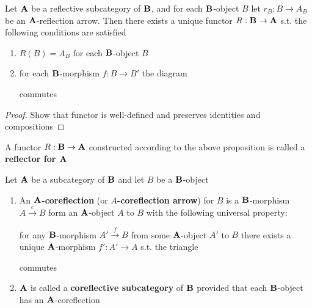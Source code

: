 \documentclass[11pt]{article}
\begin{document}
\begin{proposition}[]
Let \(\operatorname{\textbf{A}}\) be a reflective subcategory of \(\operatorname{\textbf{B}}\), and for each
\(\operatorname{\textbf{B}}\)-object \(B\) let \(r_B:B\to A_B\) be an \(\operatorname{\textbf{A}}\)-reflection arrow.
Then there exists a unique functor \(R:\operatorname{\textbf{B}}\to\operatorname{\textbf{A}}\) s.t. the following
conditions are satisfied
\begin{enumerate}
\item \(R(B)=A_B\) for each \(\operatorname{\textbf{B}}\)-object \(B\)
\item for each \(\operatorname{\textbf{B}}\)-morphism \(f:B\to B'\) the diagram
\begin{center}\end{center}
commutes
\end{enumerate}
\end{proposition}

\begin{proof}
Show that functor is well-defined and preserves identities and compositions
\end{proof}

\begin{definition}[]
A functor \(R:\operatorname{\textbf{B}}\to\operatorname{\textbf{A}}\) constructed according to the above proposition is
called a \textbf{reflector for \(\operatorname{\textbf{A}}\)}
\end{definition}

\begin{definition}[]
Let \(\operatorname{\textbf{A}}\) be a subcategory of \(\operatorname{\textbf{B}}\) and let \(B\) be a \(\operatorname{\textbf{B}}\)-object
\begin{enumerate}
\item An \textbf{\(\operatorname{\textbf{A}}\)-coreflection} (or \textbf{\(A\)-coreflection arrow}) for \(B\) is a
\(\operatorname{\textbf{B}}\)-morphism \(A\xrightarrow{c}B\) form an \(\operatorname{\textbf{A}}\)-object \(A\) to
\(B\) with the following universal property:

for any \(\operatorname{\textbf{B}}\)-morphism \(A'\xrightarrow{f}B\) from some \(\operatorname{\textbf{A}}\)-object
\(A'\) to \(B\) there exists a unique \(\operatorname{\textbf{A}}\)-morphism \(f':A'\to A\) s.t.
the triangle
\begin{center}\end{center}
commutes

\item \(\operatorname{\textbf{A}}\) is called a \textbf{coreflective subcategory} of \(\operatorname{\textbf{B}}\) provided that each
\(\operatorname{\textbf{B}}\)-object has an \(\operatorname{\textbf{A}}\)-coreflection
\end{enumerate}
\end{definition}
\end{document}
